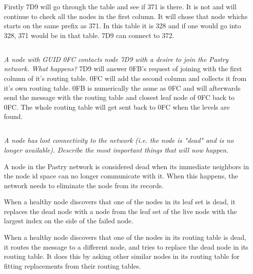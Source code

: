 \documentclass{article}
\newcommand{\question}[1]{\subsection{}\textit{#1}\bigskip}
\begin{document}
Firstly 7D9 will go through the table and see if 371 is there. It is not and will continue to check all the nodes in the first column. It will chose that node whichs starts on the same prefix as 371. In this table it is 328 and if one would go into 328, 371 would be in that table. 7D9 can connect to 372.

\question{A node with GUID 0FC contacts node 7D9 with a desire to join the Pastry network. What happens?}
7D9 will answer 0FB's request of joining with the first column of it's routing table. 0FC will add the second column and collects it from it's own routing table. 0FB is numerically the asme as 0FC and will afterwards send the message with the routing table and closest leaf node of 0FC back to 0FC. The whole routing table will get sent back to 0FC when the levels are found.

\question{A node has lost connectivity to the network (i.e. the node is "dead" and is no longer available). Describe the most important things that will now happen.}

A node in the Pastry network is considered dead when its immediate neighbors in the node id space can no longer communicate with it.
When this happens, the network needs to eliminate the node from its records.

When a healthy node discovers that one of the nodes in its leaf set is dead, it replaces the dead node with a node from the leaf set of the live node with the largest index on the side of the failed node.

When a healthy node discovers that one of the nodes in its routing table is dead, it routes the message to a different node, and tries to replace the dead node in its routing table.
It does this by asking other similar nodes in its routing table for fitting replacements from their routing tables.
\end{document}
